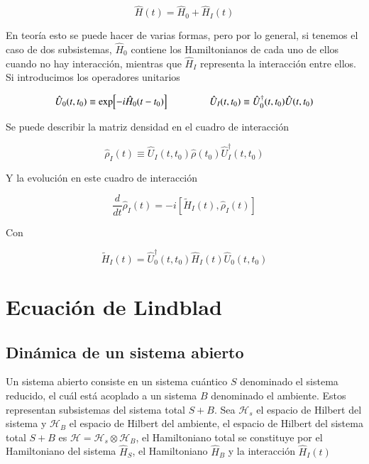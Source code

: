 \begin{equation*}
    \hat{H}(t) = \hat{H}_{0} + \hat{H}_{I}(t)
\end{equation*}

En teoría esto se puede hacer de varias formas, pero por lo general, si tenemos el caso de dos subsistemas, $\hat{H}_{0}$ contiene los Hamiltonianos de cada uno de ellos cuando no hay interacción, mientras que $\hat{H}_{I}$ representa la interacción entre ellos. Si introducimos los operadores unitarios

\begin{equation*}
    \hat{U}_{0}(t,t_{0}) \equiv \exp[-i\hat{H}_{0}(t-t_{0}) ]  \hspace{15mm} \hat{U}_{I}(t,t_0) \equiv \hat{U}^{\dagger}_{0}(t,t_{0})\hat{U}(t,t_{0})
\end{equation*}

Se puede describir la matriz densidad en el cuadro de interacción

\begin{equation*}
    \hat{\rho}_{I}(t) \equiv \hat{U}_{I}(t,t_{0})\hat{\rho}(t_{0})\hat{U}^{\dagger}_{I}(t,t_{0})
\end{equation*}

Y la evolución en este cuadro de interacción

\begin{equation}
    \frac{d}{dt}\hat{\rho}_{I}(t) = -i[\tilde{H}_{I}(t), \hat{\rho}_{I}(t)]
    \label{sec11:interactionp}
\end{equation}

Con 

\begin{equation*}
    \tilde{H}_{I}(t) = \hat{U}^{\dagger}_{0}(t,t_{0})\hat{H}_{I}(t)\hat{U}_{0}(t,t_{0})
\end{equation*}

\label{sec:closedQM}



\section{Ecuación de Lindblad}

\subsection{Dinámica de un sistema abierto}

Un sistema abierto consiste en un sistema cuántico $S$ denominado el sistema reducido, el cuál está acoplado a un sistema $B$ denominado el ambiente. Estos representan  subsistemas del sistema total $S+B$. Sea $\mathcal{H}_{s}$ el espacio de Hilbert del sistema y $\mathcal{H}_{B}$ el espacio de Hilbert del ambiente, el espacio de Hilbert del sistema total $S+B$ es  $\mathcal{H} = \mathcal{H}_{s} \otimes \mathcal{H}_{B}$, el Hamiltoniano total se constituye por el Hamiltoniano del sistema $\hat{H}_{S}$, el Hamiltoniano $\hat{H}_{B}$ y la interacción $\hat{H}_{I}(t)$

